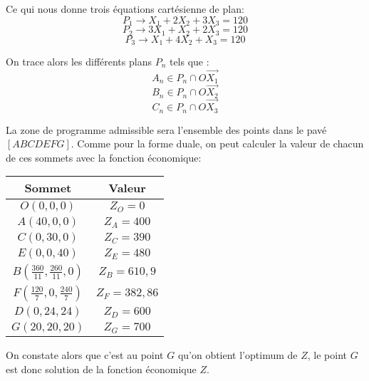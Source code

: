 Ce qui nous donne trois équations cartésienne de plan:
$$ P_{1} \rightarrow X_{1} + 2X_{2} + 3X_{3} = 120 $$
$$ P_{2} \rightarrow 3X_{1} + X_{2} + 2X_{3} = 120 $$
$$ P_{3} \rightarrow X_{1} + 4X_{2} + X_{3} = 120 $$

\newpage

On trace alors les différents plans $P_{n}$ tels que :
$$ A_{n} \in P_{n}  \cap O\overrightarrow{X_{1}} $$
$$ B_{n} \in P_{n}  \cap O\overrightarrow{X_{2}} $$
$$ C_{n} \in P_{n}  \cap O\overrightarrow{X_{3}} $$


La zone de programme admissible sera l'ensemble des points dans le pavé $[ABCDEFG]$.
Comme pour la forme duale, on peut calculer la valeur de chacun de ces sommets avec la fonction économique:
\begin{center}
   \begin{tabular}{ c | c  }
     Sommet & Valeur \\ \hline
     $O(0,0,0)$ & $Z_{O} = 0$ \\
     $A(40,0,0)$ & $Z_{A} = 400$ \\
     $C(0,30,0)$ & $Z_{C} = 390$ \\
     $E(0,0,40)$ & $Z_{E} = 480$ \\
     $B(\frac{360}{11},\frac{260}{11},0)$ & $Z_{B} = 610,9$ \\
     $F(\frac{120}{7},0,\frac{240}{7})$ & $Z_{F} = 382,86$ \\
     $D(0,24,24)$ & $Z_{D} = 600$ \\
     $G(20,20,20)$ & $Z_{G} = 700$ \\
   \end{tabular}
 \end{center}

On constate alors que c'est au point $G$ qu'on obtient l'optimum de $Z$, le point $G$ est donc solution de la fonction économique $Z$.



